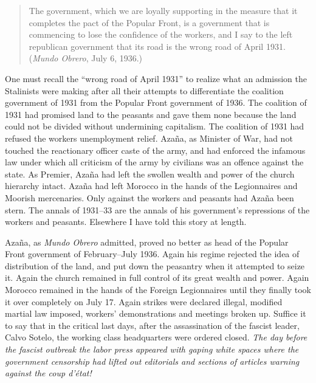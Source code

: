 \begin{quotation}
  The government, which we are loyally supporting in the measure that it completes the pact of the Popular Front, is a government that is commencing to lose the confidence of the workers, and I say to the left republican government that its road is the wrong road of April 1931. (\emph{Mundo Obrero}{\indexMundoObrero}, July 6, 1936.)
\end{quotation}

One must recall the ``wrong road of April 1931'' to realize what an admission the Stalinists were making after all their attempts to differentiate the coalition government of 1931 from the Popular Front government of 1936. The coalition of 1931 had promised land to the peasants and gave them none because the land could not be divided without undermining capitalism. The coalition of 1931 had refused the workers unemployment relief. Azaña, as Minister of War, had not touched the reactionary officer caste of the army, and had enforced the infamous law under which all criticism of the army by civilians was an offence against the state. As Premier, Azaña had left the swollen wealth and power of the church hierarchy intact. Azaña had left Morocco in the hands of the Legionnaires and Moorish mercenaries. Only against the workers and peasants had Azaña been stern. The annals of 1931--33 are the annals of his government’s repressions of the workers and peasants. Elsewhere\label{en:CivilWarReference} I have told this story at length.

Azaña, as \emph{Mundo Obrero} admitted, proved no better as head of the Popular Front government of February--July 1936. Again his regime rejected the idea of distribution of the land, and put down the peasantry when it attempted to seize it. Again the church remained in full control of its great wealth and power. Again Morocco remained in the hands of the Foreign Legionnaires until they finally took it over completely on July 17. Again strikes were declared illegal, modified martial law imposed, workers’ demonstrations and meetings broken up. Suffice it to say that in the critical last days, after the assassination of the fascist leader, Calvo Sotelo, the working class headquarters were ordered closed. \emph{The day before the fascist outbreak the labor press appeared with gaping white spaces where the government censorship had lifted out editorials and sections of articles warning against the \emph{coup d’\'etat}!}

